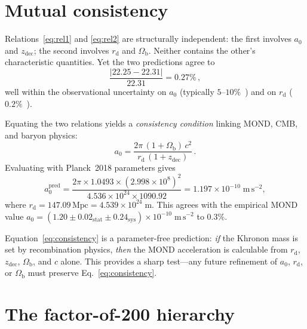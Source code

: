 \documentclass[prl,twocolumn,superscriptaddress,longbibliography]{revtex4-2}
\newcommand{\Mpc}{\,\mathrm{Mpc}}
\newcommand{\zdec}{z_{\mathrm{dec}}}
\newcommand{\rd}{r_{\mathrm{d}}}
\newcommand{\Ob}{\Omega_{\mathrm{b}}}
\begin{document}
\section{Mutual consistency}
\label{sec:consistency}

Relations~\eqref{eq:rel1} and \eqref{eq:rel2}
are structurally independent:
the first involves $a_0$ and $\zdec$; the second
involves $\rd$ and $\Ob$.
Neither contains the other's characteristic quantities.
Yet the two predictions agree to
\begin{equation}
  \frac{|22.25 - 22.31|}{22.31} = 0.27\% \,,
\end{equation}
well within the observational uncertainty on $a_0$
(typically $5$--$10\%$~\cite{McGaugh2016,Lelli2017})
and on $\rd$ ($0.2\%$~\cite{Planck2018}).

Equating the two relations yields a
\emph{consistency condition}
linking MOND, CMB, and baryon physics:
\begin{equation}
  a_0
  = \frac{2\pi\,(1 + \Ob)\,c^2}
         {\rd\,(1 + \zdec)} \,.
  \label{eq:consistency}
\end{equation}
Evaluating with Planck~2018 parameters gives
\begin{equation}
  a_0^{\mathrm{pred}}
  = \frac{2\pi \times 1.0493 \times
          (2.998 \times 10^8)^2}
         {4.536 \times 10^{24} \times 1090.92}
  = 1.197 \times 10^{-10}\;\mathrm{m\,s}^{-2} ,
  \label{eq:a0_pred}
\end{equation}
where $\rd = 147.09\Mpc = 4.539 \times 10^{24}\;\mathrm{m}$.
This agrees with the empirical MOND value
$a_0 = (1.20 \pm 0.02_{\mathrm{stat}}
\pm 0.24_{\mathrm{sys}}) \times 10^{-10}\;\mathrm{m\,s}^{-2}$
\cite{McGaugh2016,Lelli2017} to $0.3\%$.

Equation~\eqref{eq:consistency} is a parameter-free
prediction: \emph{if} the Khronon mass is set by
recombination physics, \emph{then} the MOND
acceleration is calculable from $\rd$, $\zdec$,
$\Ob$, and $c$ alone.
This provides a sharp test---any future refinement
of $a_0$, $\rd$, or $\Ob$ must preserve
Eq.~\eqref{eq:consistency}.


\section{The factor-of-200 hierarchy}
\label{sec:hierarchy}
\end{document}

